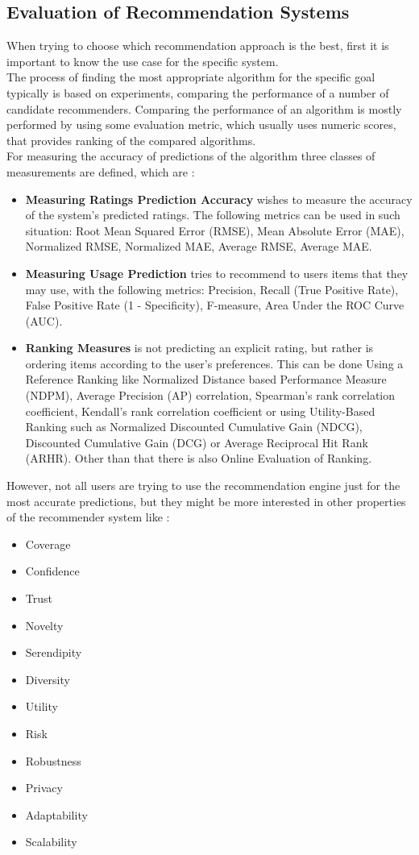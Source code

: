 \documentclass[\myFontSize,a4paper,oneside,english,hidelinks]{article}
\begin{document}
\subsection{Evaluation of Recommendation Systems}
When trying to choose which recommendation approach is the best, first it is important to know the use case for the specific system. \\
The process of finding the most appropriate algorithm for the specific goal typically is based on experiments, comparing the performance of a number of candidate recommenders. Comparing the performance of an algorithm is mostly performed by using some evaluation metric, which usually uses numeric scores, that provides ranking of the compared algorithms. \\
For measuring the accuracy of predictions of the algorithm three classes of measurements are defined, which are \cite{Gunawardana2022547}:
\begin{itemize}
\item \textbf{Measuring Ratings Prediction Accuracy} wishes to measure the accuracy of the system's predicted ratings. The following metrics can be used in such situation: Root Mean Squared Error (RMSE), Mean Absolute Error (MAE), Normalized RMSE, Normalized MAE, Average RMSE, Average MAE.
\item \textbf{Measuring Usage Prediction} tries to recommend to users items that they may use, with the following metrics: Precision, Recall (True Positive Rate), False Positive Rate (1 - Specificity), F-measure, Area Under the ROC Curve (AUC).
\item \textbf{Ranking Measures} is not predicting an explicit rating, but rather is ordering items according to the user's preferences. This can be done Using a Reference Ranking like Normalized Distance based Performance Measure (NDPM), Average Precision (AP) correlation, Spearman's rank correlation coefficient, Kendall's rank correlation coefficient or using Utility-Based Ranking such as Normalized Discounted Cumulative Gain (NDCG), Discounted Cumulative Gain (DCG) or Average Reciprocal Hit Rank (ARHR). Other than that there is also Online Evaluation of Ranking.
\end{itemize}
%
%
%
However, not all users are trying to use the recommendation engine just for the most accurate predictions, but they might be more interested in other properties of the recommender system like \cite{Gunawardana2022547}:
\begin{multicols}{3}
\begin{itemize}
\item Coverage
\item Confidence
\item Trust
\item Novelty
\item Serendipity
\item Diversity
\item Utility
\item Risk
\item Robustness
\item Privacy
\item Adaptability
\item Scalability
\end{itemize}
\end{multicols}
\end{document}
